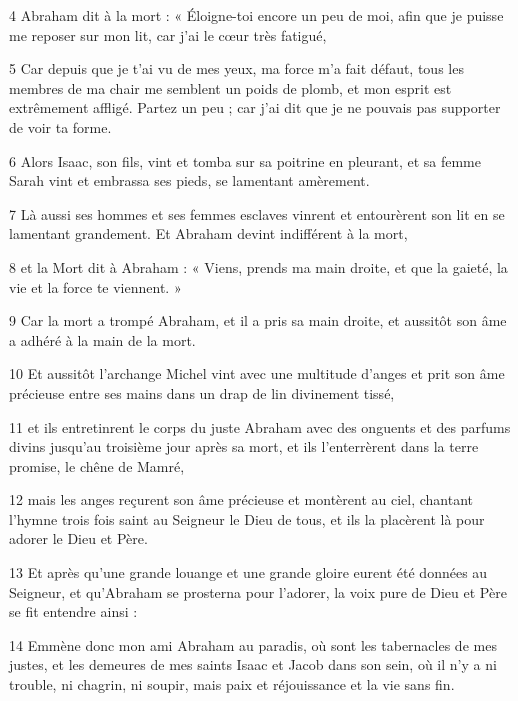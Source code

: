 \par 4 Abraham dit à la mort : « Éloigne-toi encore un peu de moi, afin que je puisse me reposer sur mon lit, car j'ai le cœur très fatigué,

\par 5 Car depuis que je t'ai vu de mes yeux, ma force m'a fait défaut, tous les membres de ma chair me semblent un poids de plomb, et mon esprit est extrêmement affligé. Partez un peu ; car j’ai dit que je ne pouvais pas supporter de voir ta forme.

\par 6 Alors Isaac, son fils, vint et tomba sur sa poitrine en pleurant, et sa femme Sarah vint et embrassa ses pieds, se lamentant amèrement.

\par 7 Là aussi ses hommes et ses femmes esclaves vinrent et entourèrent son lit en se lamentant grandement. Et Abraham devint indifférent à la mort,

\par 8 et la Mort dit à Abraham : « Viens, prends ma main droite, et que la gaieté, la vie et la force te viennent. »

\par 9 Car la mort a trompé Abraham, et il a pris sa main droite, et aussitôt son âme a adhéré à la main de la mort.

\par 10 Et aussitôt l'archange Michel vint avec une multitude d'anges et prit son âme précieuse entre ses mains dans un drap de lin divinement tissé,

\par 11 et ils entretinrent le corps du juste Abraham avec des onguents et des parfums divins jusqu'au troisième jour après sa mort, et ils l'enterrèrent dans la terre promise, le chêne de Mamré,

\par 12 mais les anges reçurent son âme précieuse et montèrent au ciel, chantant l'hymne trois fois saint au Seigneur le Dieu de tous, et ils la placèrent là pour adorer le Dieu et Père.

\par 13 Et après qu'une grande louange et une grande gloire eurent été données au Seigneur, et qu'Abraham se prosterna pour l'adorer, la voix pure de Dieu et Père se fit entendre ainsi :

\par 14 Emmène donc mon ami Abraham au paradis, où sont les tabernacles de mes justes, et les demeures de mes saints Isaac et Jacob dans son sein, où il n'y a ni trouble, ni chagrin, ni soupir, mais paix et réjouissance et la vie sans fin.

